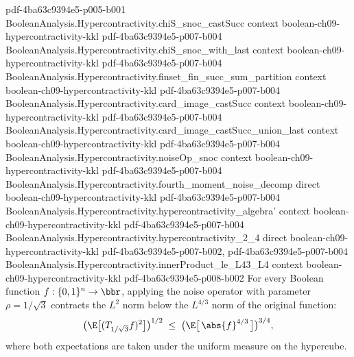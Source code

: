 \begin{theorem}[The $(4/3,2)$-hypercontractive inequality at $\rho=1/\sqrt3$]
  {pdf-4ba63c9394e5-p005-b001}
\proofstep
  {BooleanAnalysis.Hypercontractivity.chiS_snoc_castSucc}
  {context}
  {boolean-ch09-hypercontractivity-kkl}
  {pdf-4ba63c9394e5-p007-b004}
\proofstep
  {BooleanAnalysis.Hypercontractivity.chiS_snoc_with_last}
  {context}
  {boolean-ch09-hypercontractivity-kkl}
  {pdf-4ba63c9394e5-p007-b004}
\proofstep
  {BooleanAnalysis.Hypercontractivity.finset_fin_succ_sum_partition}
  {context}
  {boolean-ch09-hypercontractivity-kkl}
  {pdf-4ba63c9394e5-p007-b004}
\proofstep
  {BooleanAnalysis.Hypercontractivity.card_image_castSucc}
  {context}
  {boolean-ch09-hypercontractivity-kkl}
  {pdf-4ba63c9394e5-p007-b004}
\proofstep
  {BooleanAnalysis.Hypercontractivity.card_image_castSucc_union_last}
  {context}
  {boolean-ch09-hypercontractivity-kkl}
  {pdf-4ba63c9394e5-p007-b004}
\proofstep
  {BooleanAnalysis.Hypercontractivity.noiseOp_snoc}
  {context}
  {boolean-ch09-hypercontractivity-kkl}
  {pdf-4ba63c9394e5-p007-b004}
\proofstep
  {BooleanAnalysis.Hypercontractivity.fourth_moment_noise_decomp}
  {direct}
  {boolean-ch09-hypercontractivity-kkl}
  {pdf-4ba63c9394e5-p007-b004}
\proofstep
  {BooleanAnalysis.Hypercontractivity.hypercontractivity_algebra'}
  {context}
  {boolean-ch09-hypercontractivity-kkl}
  {pdf-4ba63c9394e5-p007-b004}
\proofstep
  {BooleanAnalysis.Hypercontractivity.hypercontractivity_2_4}
  {direct}
  {boolean-ch09-hypercontractivity-kkl}
  {pdf-4ba63c9394e5-p007-b002,
    pdf-4ba63c9394e5-p007-b004}
\proofstep
  {BooleanAnalysis.Hypercontractivity.innerProduct_le_L43_L4}
  {context}
  {boolean-ch09-hypercontractivity-kkl}
  {pdf-4ba63c9394e5-p008-b002}
For every Boolean function $f:\{0,1\}^n\to\bbr$, applying the noise operator with
parameter $\rho=1/\sqrt3$ contracts the $L^2$ norm below the $L^{4/3}$ norm of the
original function:
\[
  \bigl(\E\bigl[(T_{1/\sqrt3} f)^2\bigr]\bigr)^{1/2}
  \;\le\;
  \bigl(\E\bigl[\,\abs{f}^{4/3}\,\bigr]\bigr)^{3/4},
\]
where both expectations are taken under the uniform measure on the hypercube.
\end{theorem}

